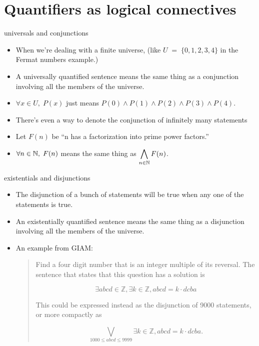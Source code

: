 \documentclass[landscape]{beamer}
\begin{document}
\section{Quantifiers as logical connectives}

\begin{frame}{universals and conjunctions}
\begin{itemize}
\item When we're dealing with a finite universe, (like $U \; = \; \{0,1,2,3,4\}$ in the Fermat numbers example.) \pause
\item A universally quantified sentence means the same thing as a conjunction involving all the members of the universe.\pause
\item $\forall x \in U, \; P(x)$ just means $P(0) \land P(1) \land P(2) \land P(3) \land P(4)$.\pause
\item There's even a way to denote the conjunction of infinitely many statements\pause 
\item Let $F(n)$ be ``n has a factorization into prime power factors.'' \pause
\item $\displaystyle \forall n \in {\mathbb N}, \; F(n)$ means the same thing as $\displaystyle \bigwedge_{n \in {\mathbb N}} F(n)$.
\end{itemize}
\end{frame}

\begin{frame}{existentials and disjunctions}
\begin{itemize}
\item The disjunction of a bunch of statements will be true when any one of the statements is true.\pause
\item An existentially quantified sentence means the same thing as a disjunction involving all the members of the universe.\pause
\item An example from GIAM:
\begin{quote}
Find a four digit number that
is an integer multiple of its reversal. The sentence that states that this question has a solution is

\[
\exists abcd \in {\mathbb Z},  \exists k \in {\mathbb Z}, abcd = k\cdot dcba
\]

This could be expressed instead as the disjunction of 9000 statements, or more 
compactly as

\[
\bigvee_{1000\leq abcd \leq 9999}  \exists k \in {\mathbb Z}, abcd = k\cdot dcba.
\]

\end{quote}
\end{itemize}
\end{frame}
\end{document}

